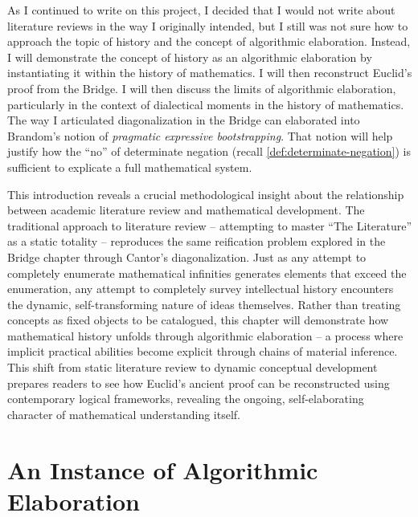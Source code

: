 \documentclass[12pt]{book}
\begin{document}
As I continued to write on this project, I decided that I would not write about literature reviews in the way I originally intended, but I still was not sure how to approach the topic of history and the concept of algorithmic elaboration. Instead, I will demonstrate the concept of history as an algorithmic elaboration by instantiating it within the history of mathematics. I will then reconstruct Euclid's proof from the Bridge. I will then discuss the limits of algorithmic elaboration, particularly in the context of dialectical moments in the history of mathematics. The way I articulated diagonalization in the Bridge can elaborated into Brandom's notion of \textit{pragmatic expressive bootstrapping}. That notion will help justify how the ``no'' of determinate negation (recall \ref{def:determinate-negation}) is sufficient to explicate a full mathematical system.

This introduction reveals a crucial methodological insight about the relationship between academic literature review and mathematical development. The traditional approach to literature review -- attempting to master ``The Literature'' as a static totality -- reproduces the same reification problem explored in the Bridge chapter through Cantor's diagonalization. Just as any attempt to completely enumerate mathematical infinities generates elements that exceed the enumeration, any attempt to completely survey intellectual history encounters the dynamic, self-transforming nature of ideas themselves. Rather than treating concepts as fixed objects to be catalogued, this chapter will demonstrate how mathematical history unfolds through algorithmic elaboration -- a process where implicit practical abilities become explicit through chains of material inference. This shift from static literature review to dynamic conceptual development prepares readers to see how Euclid's ancient proof can be reconstructed using contemporary logical frameworks, revealing the ongoing, self-elaborating character of mathematical understanding itself. 





\section{An Instance of Algorithmic Elaboration}
\end{document}
